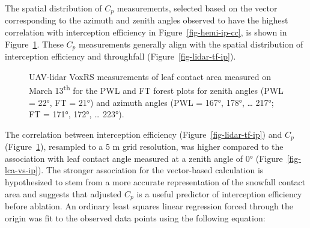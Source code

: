 \documentclass[
  letterpaper,
  DIV=11,
  numbers=noendperiod]{scrartcl}
\begin{document}
The spatial distribution of \(C_p\) measurements, selected based on the
vector corresponding to the azimuth and zenith angles observed to have
the highest correlation with interception efficiency in
Figure~\ref{fig-hemi-ip-cc}, is shown in Figure~\ref{fig-lidar-cc-cp}.
These \(C_p\) measurements generally align with the spatial distribution
of interception efficiency and throughfall
(Figure~\ref{fig-lidar-tf-ip}).

\begin{figure}[H]


\caption{\label{fig-lidar-cc-cp}UAV-lidar VoxRS measurements of leaf
contact area measured on March 13\textsuperscript{th} for the PWL and FT
forest plots for zenith angles (PWL = 22°, FT = 21°) and azimuth angles
(PWL = 167°, 178°, \ldots{} 217°; FT = 171°, 172°, \ldots{} 223°).}

\end{figure}%

The correlation between interception efficiency
(Figure~\ref{fig-lidar-tf-ip}) and \(C_p\)
(Figure~\ref{fig-lidar-cc-cp}), resampled to a 5 m grid resolution, was
higher compared to the association with leaf contact angle measured at a
zenith angle of 0° (Figure~\ref{fig-lca-vs-ip}). The stronger
association for the vector-based calculation is hypothesized to stem
from a more accurate representation of the snowfall contact area and
suggests that adjusted \(C_p\) is a useful predictor of interception
efficiency before ablation. An ordinary least squares linear regression
forced through the origin was fit to the observed data points using the
following equation:
\end{document}

